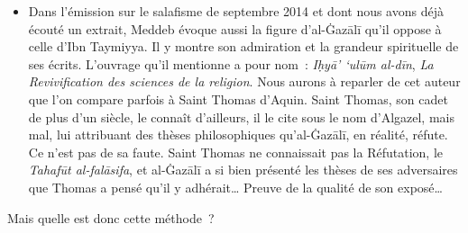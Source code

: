 \begin{itemize}
\item
  Dans l'émission sur le salafisme de septembre 2014 et dont nous avons
  déjà écouté un extrait, Meddeb évoque aussi la figure d'al-Ġazālī \label{theol:AlGazali1}
  qu'il oppose à celle d'Ibn Taymiyya. Il y montre son admiration et la
  grandeur spirituelle de ses écrits. L'ouvrage qu'il mentionne a pour
  nom~: \emph{Iḥyā' `ulūm al-dīn}, \emph{La Revivification des sciences
  de la religion}. Nous
  aurons à reparler de cet auteur que l'on compare parfois à Saint
  Thomas d'Aquin. Saint Thomas, son cadet de plus d'un siècle, le
  connaît d'ailleurs, il le cite sous le nom d'Algazel, mais mal, lui
  attribuant des thèses philosophiques qu'al-Ġazālī, en réalité, réfute.
  Ce n'est pas de sa faute. Saint Thomas ne connaissait pas la
  Réfutation, le \emph{Tahafūt al-falāsifa}, et al-Ġazālī a si bien
  présenté les thèses de ses adversaires que Thomas a pensé qu'il y
  adhérait\ldots{} Preuve de la qualité de son exposé\ldots{}
\end{itemize}

Mais quelle est donc cette méthode~?


